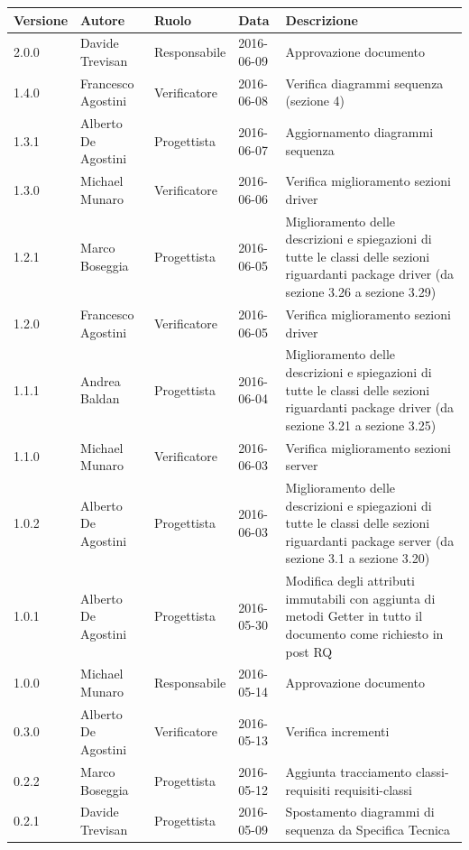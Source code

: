 \documentclass{scalatekids-article}
\begin{document}
\begin{center}
  \begin{longtable}{| l | l | l | l | p{5cm} |}
    \hline
    Versione & Autore & Ruolo & Data & Descrizione \\
    \hline
    2.0.0 & Davide Trevisan & Responsabile & 2016-06-09 & Approvazione documento\\
    \hline
    1.4.0 & Francesco Agostini & Verificatore & 2016-06-08 & Verifica diagrammi sequenza (sezione 4)\\
    \hline
    1.3.1 & Alberto De Agostini & Progettista & 2016-06-07 & Aggiornamento diagrammi sequenza\\
    \hline
    1.3.0 & Michael Munaro & Verificatore & 2016-06-06 & Verifica miglioramento sezioni driver\\
    \hline
    1.2.1 & Marco Boseggia & Progettista & 2016-06-05 & Miglioramento delle descrizioni e spiegazioni di tutte le classi delle sezioni riguardanti package driver (da sezione 3.26 a sezione 3.29)\\
    \hline
    1.2.0 & Francesco Agostini & Verificatore & 2016-06-05 & Verifica miglioramento sezioni driver\\
    \hline
    1.1.1 & Andrea Baldan & Progettista & 2016-06-04 & Miglioramento delle descrizioni e spiegazioni di tutte le classi delle sezioni riguardanti package driver (da sezione 3.21 a sezione 3.25)\\
    \hline
    1.1.0 & Michael Munaro & Verificatore & 2016-06-03 & Verifica miglioramento sezioni server\\
    \hline
    1.0.2 & Alberto De Agostini & Progettista & 2016-06-03 & Miglioramento delle descrizioni e spiegazioni di tutte le classi delle sezioni riguardanti package server (da sezione 3.1 a sezione 3.20)\\
    \hline
    1.0.1 & Alberto De Agostini & Progettista & 2016-05-30 & Modifica degli attributi immutabili con aggiunta di metodi Getter in tutto il documento come richiesto in post RQ\\
    \hline
    1.0.0 & Michael Munaro & Responsabile & 2016-05-14 & Approvazione documento\\
    \hline
    0.3.0 & Alberto De Agostini & Verificatore & 2016-05-13 & Verifica incrementi\\
    \hline
    0.2.2 & Marco Boseggia & Progettista & 2016-05-12 & Aggiunta tracciamento classi-requisiti requisiti-classi\\
    \hline
    0.2.1 & Davide Trevisan & Progettista & 2016-05-09 & Spostamento diagrammi di sequenza da Specifica Tecnica\\

\end{longtable}
\end{center}
\end{document}
